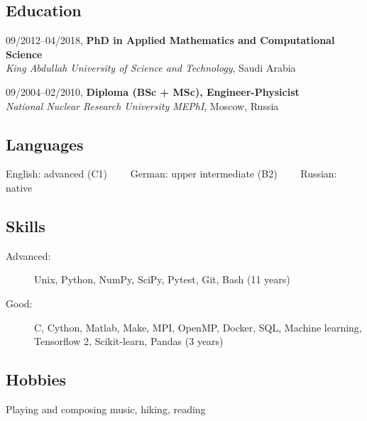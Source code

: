 \documentclass[11pt,a4paper]{article}
\renewcommand{\section}[1]{%
\begin{minipage}{\textwidth}
\vspace{1em}
\subsection*{#1 \hrulefill}
\vspace{\parskip}
\end{minipage}
}
\newcommand\skill[1]{%
    \begin{tikzpicture}
        \draw[fill=lightgray, lightgray] (0, 0) rectangle (\linewidth, 0.32);
        \draw[fill=white, color1] (0, 0) rectangle (\linewidth*#1/5, 0.32);
    \end{tikzpicture}%
}
\begin{document}
\section{Education}
09/2012--04/2018, \textbf{PhD in Applied Mathematics and Computational Science}\\
\emph{King Abdullah University of Science and Technology}, Saudi Arabia

09/2004--02/2010, \textbf{Diploma (BSc + MSc), Engineer-Physicist}\\
\emph{National Nuclear Research University MEPhI}, Moscow, Russia


\section{Languages}
English: advanced (C1) \ \ \textbullet \ \ 
German: upper intermediate (B2) \ \ \textbullet \ \ 
Russian: native\\

\section{Skills}
\begin{description}
\item[Advanced:] Unix, Python, NumPy, SciPy, Pytest, Git, Bash (11 years)
\item[Good:] C, Cython, Matlab, Make, MPI, OpenMP, Docker, SQL, Machine learning, Tensorflow 2, Scikit-learn, Pandas (3 years)
\end{description}



\section{Hobbies}
Playing and composing music, hiking, reading
\end{document}

